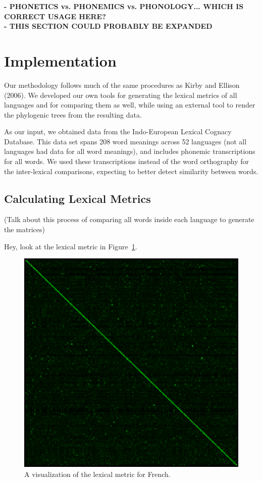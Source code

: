 \documentclass[10pt,a4]{article}
\begin{document}
\textbf{- PHONETICS vs. PHONEMICS vs. PHONOLOGY... WHICH IS CORRECT USAGE HERE?} \\

\textbf{- THIS SECTION COULD PROBABLY BE EXPANDED}

\section{Implementation}

Our methodology follows much of the same procedures as Kirby and Ellison (2006).  We developed our own tools for generating the lexical metrics of all languages and for comparing them as well, while using an external tool to render the phylogenic trees from the resulting data.

As our input, we obtained data from the Indo-European Lexical Cognacy Database.  This data set spans 208 word meanings across 52 languages (not all languages had data for all word meanings), and includes phonemic transcriptions for all words.  We used these transcriptions instead of the word orthography for the inter-lexical comparisons, expecting to better detect similarity between words.

\subsection{Calculating Lexical Metrics}

(Talk about this process of comparing all words inside each language to generate the matrices)

Hey, look at the lexical metric in Figure~\ref{fig:french}.

\begin{figure}[ht]
\centering
\includegraphics[width=0.8\linewidth]{french3}
\caption{A visualization of the lexical metric for French.}
\label{fig:french}
\end{figure}
\end{document}
